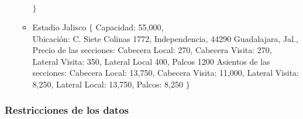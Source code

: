 \begin{itemize}
\begin{itemize}
                                  $\}$        
        \item Estadio Jalisco     $\{$ Capacidad: 55,000, \\
                                       Ubicación: C. Siete Colinas 1772, Independencia, 44290 Guadalajara, Jal.,\\
                                       Precio de las secciones: Cabecera Local: 270, Cabecera Visita: 270, Lateral Visita: 350, Lateral Local 400, Palcos 1200
                                       Asientos de las secciones: Cabecera Local: 13,750, Cabecera Visita: 11,000, Lateral Visita: 8,250, Lateral Local: 13,750, Palcos: 8,250
                                  $\}$           
    \end{itemize}
\end{itemize}

\subsubsection*{Restricciones de los datos}

